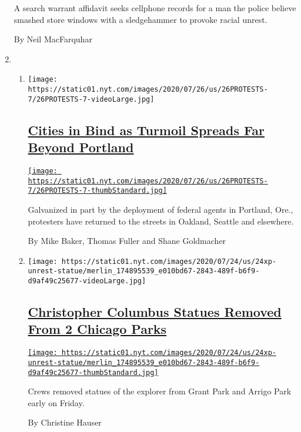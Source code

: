 \begin{enumerate}
  A search warrant affidavit seeks cellphone records for a man the
  police believe smashed store windows with a sledgehammer to provoke
  racial unrest.

  By Neil MacFarquhar
\item
  \begin{enumerate}
  \def\labelenumii{\arabic{enumii}.}
  \item
    \texttt{[image: https://static01.nyt.com/images/2020/07/26/us/26PROTESTS-7/26PROTESTS-7-videoLarge.jpg]}

    \hypertarget{cities-in-bind-as-turmoil-spreads-far-beyond-portland}{%
    \subsection{\texorpdfstring{\href{/2020/07/26/us/protests-portland-seattle-trump.html}{Cities
    in Bind as Turmoil Spreads Far Beyond
    Portland}}{Cities in Bind as Turmoil Spreads Far Beyond Portland}}\label{cities-in-bind-as-turmoil-spreads-far-beyond-portland}}

    \href{/2020/07/26/us/protests-portland-seattle-trump.html}{\texttt{[image: https://static01.nyt.com/images/2020/07/26/us/26PROTESTS-7/26PROTESTS-7-thumbStandard.jpg]}}

    Galvanized in part by the deployment of federal agents in Portland,
    Ore., protesters have returned to the streets in Oakland, Seattle
    and elsewhere.

    By Mike Baker, Thomas Fuller and Shane Goldmacher
  \item
    \texttt{[image: https://static01.nyt.com/images/2020/07/24/us/24xp-unrest-statue/merlin\_174895539\_e010bd67-2843-489f-b6f9-d9af49c25677-videoLarge.jpg]}

    \hypertarget{christopher-columbus-statues-removed-from-2-chicago-parks}{%
    \subsection{\texorpdfstring{\href{/2020/07/24/us/christopher-columbus-chicago.html}{Christopher
    Columbus Statues Removed From 2 Chicago
    Parks}}{Christopher Columbus Statues Removed From 2 Chicago Parks}}\label{christopher-columbus-statues-removed-from-2-chicago-parks}}

    \href{/2020/07/24/us/christopher-columbus-chicago.html}{\texttt{[image: https://static01.nyt.com/images/2020/07/24/us/24xp-unrest-statue/merlin\_174895539\_e010bd67-2843-489f-b6f9-d9af49c25677-thumbStandard.jpg]}}

    Crews removed statues of the explorer from Grant Park and Arrigo
    Park early on Friday.

    By Christine Hauser
  \end{enumerate}
\end{enumerate}

